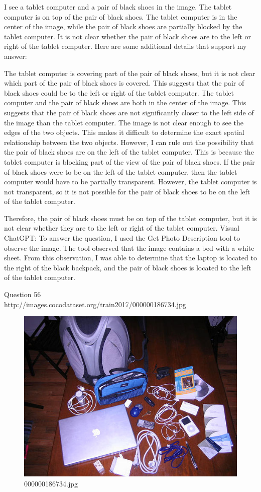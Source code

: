 \begin{enumerate}
    I see a tablet computer and a pair of black shoes in the image.
    The tablet computer is on top of the pair of black shoes.
    The tablet computer is in the center of the image, while the pair of black shoes are partially blocked by the tablet computer.
    It is not clear whether the pair of black shoes are to the left or right of the tablet computer.
    Here are some additional details that support my answer:
    
    The tablet computer is covering part of the pair of black shoes, but it is not clear which part of the pair of black shoes is covered. This suggests that the pair of black shoes could be to the left or right of the tablet computer.
    The tablet computer and the pair of black shoes are both in the center of the image. This suggests that the pair of black shoes are not significantly closer to the left side of the image than the tablet computer.
    The image is not clear enough to see the edges of the two objects. This makes it difficult to determine the exact spatial relationship between the two objects.
    However, I can rule out the possibility that the pair of black shoes are on the left of the tablet computer. This is because the tablet computer is blocking part of the view of the pair of black shoes. If the pair of black shoes were to be on the left of the tablet computer, then the tablet computer would have to be partially transparent. However, the tablet computer is not transparent, so it is not possible for the pair of black shoes to be on the left of the tablet computer.
    
    Therefore, the pair of black shoes must be on top of the tablet computer, but it is not clear whether they are to the left or right of the tablet computer.
    \subitem Visual ChatGPT: To answer the question, I used the Get Photo Description tool to observe the image. The tool observed that the image contains a bed with a white sheet. From this observation, I was able to determine that the laptop is located to the right of the black backpack, and the pair of black shoes is located to the left of the tablet computer.
\end{enumerate}
Question 56\\
http://images.cocodataset.org/train2017/000000186734.jpg
\begin{figure}[h]
    \centering
    \includegraphics[width=0.8\linewidth]{../image set/hard/000000186734.jpg}
    \caption{000000186734.jpg}
\end{figure}
